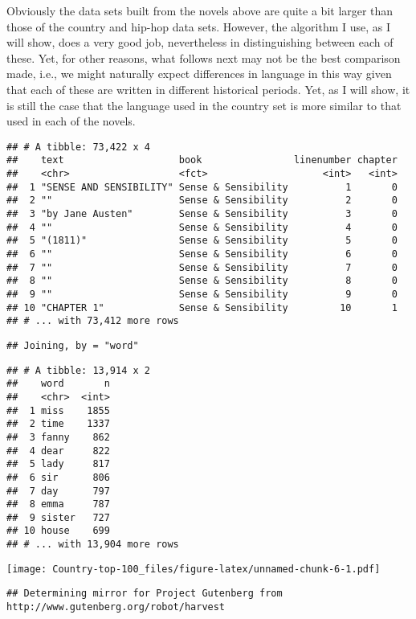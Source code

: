 \documentclass[]{article}
\begin{document}
Obviously the data sets built from the novels above are quite a bit
larger than those of the country and hip-hop data sets. However, the
algorithm I use, as I will show, does a very good job, nevertheless in
distinguishing between each of these. Yet, for other reasons, what
follows next may not be the best comparison made, i.e., we might
naturally expect differences in language in this way given that each of
these are written in different historical periods. Yet, as I will show,
it is still the case that the language used in the country set is more
similar to that used in each of the novels.

\begin{verbatim}
## # A tibble: 73,422 x 4
##    text                    book                linenumber chapter
##    <chr>                   <fct>                    <int>   <int>
##  1 "SENSE AND SENSIBILITY" Sense & Sensibility          1       0
##  2 ""                      Sense & Sensibility          2       0
##  3 "by Jane Austen"        Sense & Sensibility          3       0
##  4 ""                      Sense & Sensibility          4       0
##  5 "(1811)"                Sense & Sensibility          5       0
##  6 ""                      Sense & Sensibility          6       0
##  7 ""                      Sense & Sensibility          7       0
##  8 ""                      Sense & Sensibility          8       0
##  9 ""                      Sense & Sensibility          9       0
## 10 "CHAPTER 1"             Sense & Sensibility         10       1
## # ... with 73,412 more rows
\end{verbatim}

\begin{verbatim}
## Joining, by = "word"
\end{verbatim}

\begin{verbatim}
## # A tibble: 13,914 x 2
##    word       n
##    <chr>  <int>
##  1 miss    1855
##  2 time    1337
##  3 fanny    862
##  4 dear     822
##  5 lady     817
##  6 sir      806
##  7 day      797
##  8 emma     787
##  9 sister   727
## 10 house    699
## # ... with 13,904 more rows
\end{verbatim}

\texttt{[image: Country-top-100\_files/figure-latex/unnamed-chunk-6-1.pdf]}

\begin{verbatim}
## Determining mirror for Project Gutenberg from http://www.gutenberg.org/robot/harvest
\end{verbatim}
\end{document}
